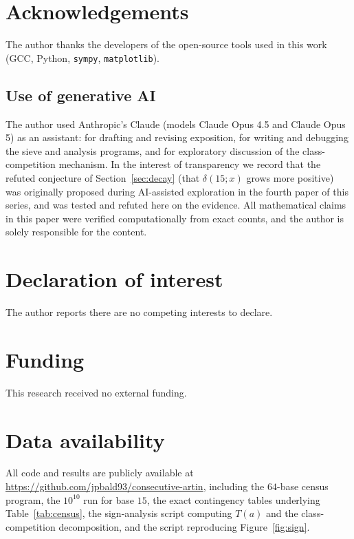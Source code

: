 \documentclass[11pt,reqno]{amsart}
\theoremstyle{plain}
\theoremstyle{definition}
\begin{document}
\section*{Acknowledgements}
The author thanks the developers of the open-source tools used in this work
(GCC, Python, \texttt{sympy}, \texttt{matplotlib}).

\subsection*{Use of generative AI}
The author used Anthropic's Claude (models Claude Opus 4.5 and Claude
Opus 5) as an assistant: for drafting and revising exposition, for writing
and debugging the sieve and analysis programs, and for exploratory
discussion of the class-competition mechanism. In the interest of
transparency we record that the refuted conjecture of
Section~\ref{sec:decay} (that $\delta(15;x)$ grows more positive) was
originally proposed during AI-assisted exploration in the fourth paper of
this series, and was tested and refuted here on the evidence. All
mathematical claims in this paper were verified computationally from exact
counts, and the author is solely responsible for the content.

\section*{Declaration of interest}
The author reports there are no competing interests to declare.

\section*{Funding}
This research received no external funding.

\section*{Data availability}
All code and results are publicly available at
\url{https://github.com/jpbald93/consecutive-artin}, including the $64$-base
census program, the $10^{10}$ run for base $15$, the exact contingency
tables underlying Table~\ref{tab:census}, the sign-analysis script computing
$T(a)$ and the class-competition decomposition, and the script reproducing
Figure~\ref{fig:sign}.
\end{document}

